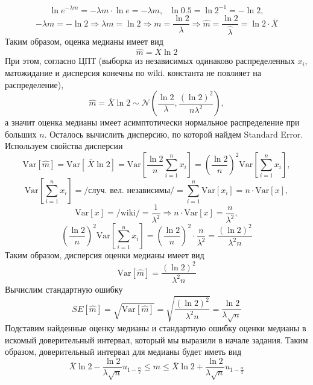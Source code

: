 \documentclass[a4paper, 12pt]{article}
\begin{document}
    $$\ln{e^{-\lambda m}}=-\lambda m\cdot\ln{e}=-\lambda m,\,\,\,\,\ln{0.5}=\ln{2^{-1}}=-\ln{2},$$
    $$-\lambda m=-\ln{2}\Rightarrow\lambda m=\ln{2}\Rightarrow m=\dfrac{\ln{2}}{\lambda}\Rightarrow\hat{m}=\dfrac{\ln{2}}{\hat{\lambda}}=\ln{2}\cdot\overline{X}$$
    Таким образом, оценка медианы имеет вид
    $$\hat{m}=\overline{X}\ln{2}$$
    При этом, согласно ЦПТ (выборка из независимых одинаково распределенных $x_i$, матожидание и дисперсия конечны по wiki. константа не повлияет на распределение),
    $$\hat{m}=\overline{X}\ln{2}\sim\mathcal{N}\left(\dfrac{\ln{2}}{\lambda},\dfrac{\left(\ln{2}\right)^2}{n\lambda^2}\right),$$
    а значит оценка медианы имеет асимптотически нормальное распределение при больших $n$.
    Осталось вычислить дисперсию, по которой найдем Standard Error. Используем свойства дисперсии
    $$\text{Var}\left[\hat{m}\right]=\text{Var}\left[\,\overline{X}\ln{2}\right]=\text{Var}\left[\dfrac{\ln{2}}{n}\sum_{i=1}^{n}x_i\right]=\left(\dfrac{\ln{2}}{n}\right)^2\text{Var}\left[\sum_{i=1}^{n}x_i\right],$$
    $$\text{Var}\left[\sum_{i=1}^{n}x_i\right]=\text{/случ. вел. независимы/}=\sum_{i=1}^{n}\text{Var}\left[x_i\right]=n\cdot\text{Var}\left[x\right],$$
    $$\text{Var}\left[x\right]=\text{/wiki/}=\dfrac{1}{\lambda^2}\Rightarrow n\cdot\text{Var}\left[x\right]=\dfrac{n}{\lambda^2},$$
    $$\left(\dfrac{\ln{2}}{n}\right)^2\text{Var}\left[\sum_{i=1}^{n}x_i\right]=\left(\dfrac{\ln{2}}{n}\right)^2\cdot\dfrac{n}{\lambda^2}=\dfrac{\left(\ln{2}\right)^2}{\lambda^2 n}$$
    Таким образом, дисперсия оценки медианы имеет вид
    $$\text{Var}\left[\hat{m}\right]=\dfrac{\left(\ln{2}\right)^2}{\lambda^2 n}$$
    Вычислим стандартную ошибку
    $$SE\left[\hat{m}\right]=\sqrt{\text{Var}\left[\hat{m}\right]}=\sqrt{\dfrac{\left(\ln{2}\right)^2}{\lambda^2 n}}=\dfrac{\ln{2}}{\lambda\sqrt{n}}$$
    Подставим найденные оценку медианы и стандартную ошибку оценки медианы в искомый доверительный интервал, который мы выразили в начале задания.
    Таким образом, доверительный интервал для медианы будет иметь вид
    $$\overline{X}\ln{2}-\dfrac{\ln{2}}{\lambda\sqrt{n}}u_{1-\frac{\alpha}{2}}\leq m\leq\overline{X}\ln{2}+\dfrac{\ln{2}}{\lambda\sqrt{n}}u_{1-\frac{\alpha}{2}}$$
\end{document}
